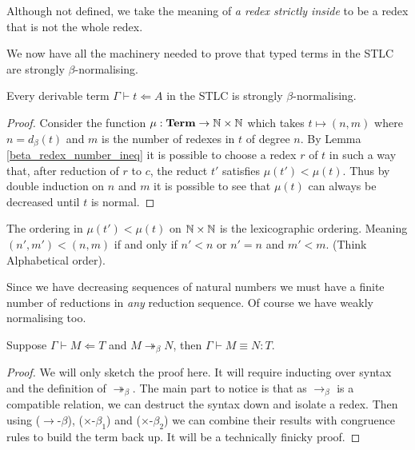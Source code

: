 \begin{remark}
    Although not defined, we take the meaning of \emph{a redex strictly inside} to be a redex that is not the whole redex.
\end{remark}

We now have all the machinery needed to prove that typed terms in the STLC are strongly $\beta$-normalising.

\begin{theorem}\label{beta_SN}
    Every derivable term $\Gamma \vdash t \Leftarrow A$ in the STLC is strongly $\beta$-normalising.
\end{theorem}

\begin{proof}
    Consider the function $\mu : \mathbf{Term} \to \mathbb{N} \times \mathbb{N}$ which takes $t \mapsto (n, m)$ where $n = d_{\beta}(t)$ and $m$ is the number of redexes in $t$ of degree $n$. By Lemma \ref{beta_redex_number_ineq} it is possible to choose a redex $r$ of $t$ in such a way that, after reduction of $r$ to $c$, the reduct $t'$ satisfies $\mu(t') < \mu(t)$. Thus by double induction on $n$ and $m$ it is possible to see that $\mu(t)$ can always be decreased until $t$ is normal.
\end{proof}

\begin{remark}
    The ordering in $\mu(t') < \mu(t)$ on $\mathbb{N} \times \mathbb{N} $ is the lexicographic ordering. Meaning $(n', m') < (n, m)$ if and only if $n' < n$ or $n'=n$ and $m' < m$. (Think Alphabetical order).
\end{remark}

\begin{remark}
    Since we have decreasing sequences of natural numbers we must have a finite number of reductions in \emph{any} reduction sequence. Of course we have weakly normalising too.
\end{remark}

\begin{lemma}\label{beta_coh}
    Suppose $\Gamma \vdash M \Leftarrow T$ and $M \twoheadrightarrow_{\beta} N$, then $\Gamma \vdash M \equiv N : T$.
\end{lemma}

\begin{proof}
    We will only sketch the proof here. It will require inducting over syntax and the definition of $\twoheadrightarrow_\beta$. The main part to notice is that as $\to_\beta$ is a compatible relation, we can destruct the syntax down and isolate a redex. Then using ($\to$-$\beta$), ($\times$-$\beta_1$) and ($\times$-$\beta_2$) we can combine their results with congruence rules to build the term back up. It will be a technically finicky proof.
\end{proof}


